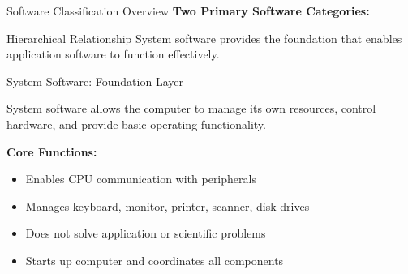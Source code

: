 \documentclass[aspectratio=169]{beamer}
\begin{document}
\begin{frame}{Software Classification Overview}
    \textbf{Two Primary Software Categories:}
    
    \begin{center}
    \end{center}
    
    \begin{exampleblock}{Hierarchical Relationship}
        System software provides the foundation that enables application software to function effectively.
    \end{exampleblock}
\end{frame}

\begin{frame}{System Software: Foundation Layer}
    \begin{definition}
        System software allows the computer to manage its own resources, control hardware, and provide basic operating functionality.
    \end{definition} 
    
    \textbf{Core Functions:}
    \begin{itemize}
        \item Enables CPU communication with peripherals
        \item Manages keyboard, monitor, printer, scanner, disk drives
        \item Does not solve application or scientific problems
        \item Starts up computer and coordinates all components
    \end{itemize}  
\end{frame}
 
\end{document}
